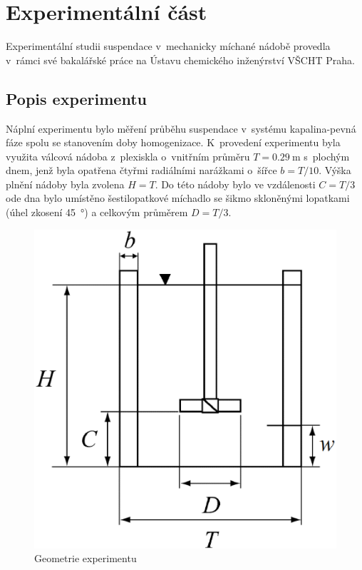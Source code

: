\chapter{Experimentální část}
Experimentální studii suspendace v~mechanicky míchané nádobě provedla \citet{pav11} v~rámci své bakalářské práce na Ústavu chemického inženýrství VŠCHT Praha.

\section{Popis experimentu}
\label{chap:exp}
Náplní experimentu bylo měření průběhu suspendace v~systému kapalina-pevná fáze spolu se stanovením doby homogenizace. K~provedení experimentu byla využita válcová nádoba z~plexiskla o~vnitřním průměru $T=\SI{0.29}{\meter}$ s~plochým dnem, jenž byla opatřena čtyřmi radiálními narážkami o~šířce $b=T/10$. Výška plnění nádoby byla zvolena $H=T$. Do této nádoby bylo ve vzdálenosti $C=T/3$ ode dna bylo umístěno šestilopatkové míchadlo se šikmo skloněnými lopatkami (úhel zkosení \SI{45}{\degree}) a celkovým průměrem  $D=T/3$. 
\begin{figure}[h!]
\centering
\includegraphics[scale=0.44]{images/mujedit.eps}
\caption{Geometrie experimentu}
\label{fig:nadoba}
\end{figure} 

